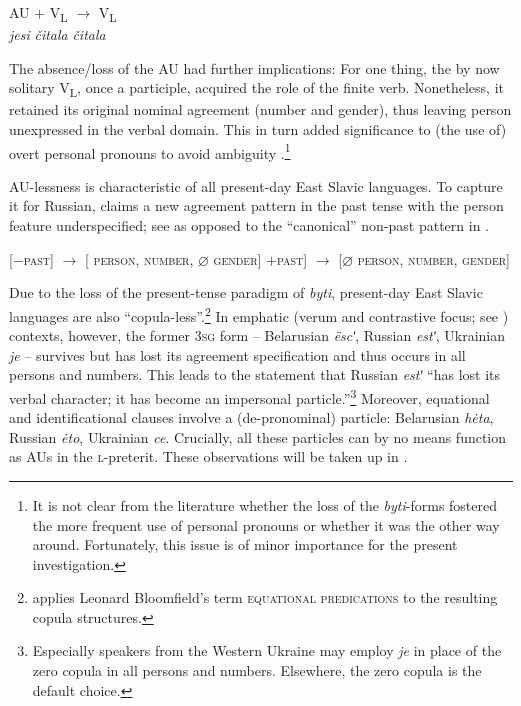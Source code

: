 \documentclass[output=paper]{langscibook}
\begin{document}
\ea 
\gll AU $+$ V\textsubscript{L} $\longrightarrow$ V\textsubscript{L} \\
\textit{jesi} {} \textit{čitala} {} \textit{čitala} \\
\label{pitsch:ex:OldRussianChange_Perfect}
\z

\noindent The absence/loss of the AU had further implications: For one thing, the by now solitary V\textsubscript{L}, once a participle, acquired the role of the finite verb. Nonetheless, it retained its original nominal agreement (number and gender), thus leaving person unexpressed in the verbal domain. This in turn added significance to (the use of) overt personal pronouns to avoid ambiguity \citep[see][193]{Issatchenko1940}.\footnote{It is not clear from the literature whether the loss of the \textit{byti}-forms fostered the more frequent use of personal pronouns or whether it was the other way around. Fortunately, this issue is of minor importance for the present investigation.} 

AU-lessness is characteristic of all present-day East Slavic languages. To capture it for Russian, \citet{Junghanns1995} claims a new agreement pattern in the past tense with the person feature underspecified; see  as opposed to the ``canonical'' non-past pattern in .

\ea
\ea
{[}$-$\textsc{past}] $\rightarrow$ [\textalpha\!  \textsc{person}, \textbeta\! \textsc{number}, $\varnothing$\! \textsc{gender}]\label{pitsch:ex:Junghanns_a}
\ex {[}$+$\textsc{past}] $\rightarrow$ [$\varnothing$\! \textsc{person}, \textbeta\! \textsc{number}, \textgamma\! \textsc{gender}] \label{pitsch:ex:Junghanns_b}\\\hfill \citep[see][174]{Junghanns1995}
\z
\z

\noindent Due to the loss of the present-tense paradigm of \textit{byti}, present-day East Slavic languages are also ``copula-less''.\footnote{\citet[192]{Issatchenko1940} applies Leonard Bloomfield's term \textsc{equational predications} to the resulting copula structures.} In emphatic (verum and contrastive focus; see \citealt[127]{Geist2007}) contexts, however, the former \textsc{3sg} form -- Belarusian \textit{ëscʹ}, Russian \textit{estʹ}, Ukrainian \textit{je} -- survives but has lost its agreement specification and thus occurs in all persons and numbers. This leads \citet[192]{Issatchenko1940} to the statement that Russian \textit{estʹ} ``has lost its verbal character; it has become an impersonal particle.''\footnote{Especially speakers from the Western Ukraine may employ \textit{je} in place of the zero copula in all persons and numbers. Elsewhere, the zero copula is the default choice.} Moreover, equational and identificational clauses involve a (de-pronominal) particle: Belarusian \textit{hėta}, Russian \textit{ėto}, Ukrainian \textit{ce}. Crucially, all these particles can by no means function as AUs in the \textsc{l-}preterit. These observations will be taken up in .
\end{document}

